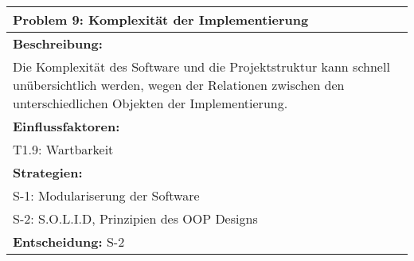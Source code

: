 \documentclass[fontsize=12pt,paper=a4,twoside]{scrartcl}
\begin{document}
\begin{longtable}{|p{15cm}|}
\hline
Problem 9: Komplexität der Implementierung                                                                       
\\ \hline                                                                                                                                                                                                                                                                                                                                                                                                                                                                                                                                                        
\textbf{Beschreibung:} \\
Die Komplexität des Software und die Projektstruktur kann schnell unübersichtlich werden, wegen der Relationen zwischen den unterschiedlichen Objekten der Implementierung.
\\ \hline
\textbf{Einflussfaktoren:} \\
T1.9: Wartbarkeit
\\ \hline
\textbf{Strategien:} \\
S-1: Modulariserung der Software \\
S-2: S.O.L.I.D, Prinzipien des OOP Designs
 \\ \hline
 \textbf{Entscheidung:} S-2
\\ \hline
\end{longtable}
\end{document}

